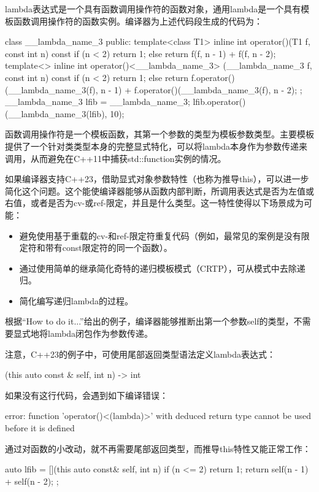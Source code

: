 lambda表达式是一个具有函数调用操作符的函数对象，通用lambda是一个具有模板函数调用操作符的函数实例。编译器为上述代码段生成的代码为：

\begin{cpp}
class __lambda_name_3
{
    public:
    template<class T1>
    inline int operator()(T1 f, const int n) const
    {
        if (n < 2) {
            return 1;
        }
        else {
            return f(f, n - 1) + f(f, n - 2);
        }
    }
    template<>
    inline int operator()<__lambda_name_3> (__lambda_name_3 f,
    const int n) const
    {
        if (n < 2) {
            return 1;
        }
        else {
            return f.operator()(__lambda_name_3(f), n - 1) +
            f.operator()(__lambda_name_3(f), n - 2);
        }
    }
};
__lambda_name_3 lfib = __lambda_name_3{};
lfib.operator()(__lambda_name_3(lfib), 10);
\end{cpp}

函数调用操作符是一个模板函数，其第一个参数的类型为模板参数类型。主要模板提供了一个针对类类型本身的完整显式特化，可以将lambda本身作为参数传递来调用，从而避免在C++11中捕获std::function实例的情况。

如果编译器支持C++23，借助显式对象参数特性（也称为推导this），可以进一步简化这个问题。这个能使编译器能够从函数内部判断，所调用表达式是否为左值或右值，或者是否为cv-或ref-限定，并且是什么类型。这一特性使得以下场景成为可能：

\begin{itemize}
\item
避免使用基于重载的cv-和ref-限定符重复代码（例如，最常见的案例是没有限定符和带有const限定符的同一个函数）。

\item
通过使用简单的继承简化奇特的递归模板模式（CRTP），可从模式中去除递归。

\item
简化编写递归lambda的过程。
\end{itemize}

根据“How to do it...”给出的例子，编译器能够推断出第一个参数self的类型，不需要显式地将lambda闭包作为参数传递。

注意，C++23的例子中，可使用尾部返回类型语法定义lambda表达式：

\begin{cpp}
[](this auto const & self, int n) -> int
\end{cpp}

如果没有这行代码，会遇到如下编译错误：

\begin{shell}
error: function 'operator()<(lambda)>' with deduced return type cannot be used before it is defined
\end{shell}

通过对函数的小改动，就不再需要尾部返回类型，而推导this特性又能正常工作：

\begin{cpp}
auto lfib = [](this auto const& self, int n)
{
    if (n <= 2) return 1;
    return self(n - 1) + self(n - 2);
};
\end{cpp}

